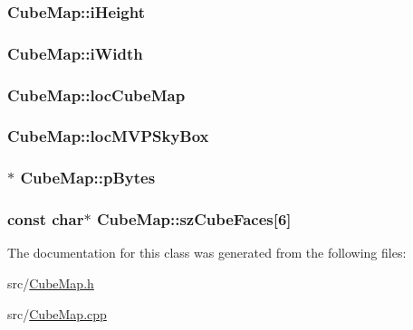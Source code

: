 \hypertarget{class_cube_map_a3eb7318d91d9790719dccfba29d80339}{
\subsubsection[{i\-Height}]{ Cube\-Map\-::i\-Height}}\label{class_cube_map_a3eb7318d91d9790719dccfba29d80339}
\hypertarget{class_cube_map_abc8fae6477d92d7a974f7d924aa932fc}{
\subsubsection[{i\-Width}]{ Cube\-Map\-::i\-Width}}\label{class_cube_map_abc8fae6477d92d7a974f7d924aa932fc}
\hypertarget{class_cube_map_aba9d6a9c7f818edba9bd19611d3b2fdc}{
\subsubsection[{loc\-Cube\-Map}]{ Cube\-Map\-::loc\-Cube\-Map}}\label{class_cube_map_aba9d6a9c7f818edba9bd19611d3b2fdc}
\hypertarget{class_cube_map_a112ed4032bed21e59f649eb28d99a72f}{
\subsubsection[{loc\-M\-V\-P\-Sky\-Box}]{ Cube\-Map\-::loc\-M\-V\-P\-Sky\-Box}}\label{class_cube_map_a112ed4032bed21e59f649eb28d99a72f}
\hypertarget{class_cube_map_aaede2138131291660c5758634f15adec}{
\subsubsection[{p\-Bytes}]{$\ast$ Cube\-Map\-::p\-Bytes}}\label{class_cube_map_aaede2138131291660c5758634f15adec}
\hypertarget{class_cube_map_a9174fa6b7453790a52d6a5e3fc72807b}{
\subsubsection[{sz\-Cube\-Faces}]{\setlength{\rightskip}{0pt plus 5cm}const char$\ast$ Cube\-Map\-::sz\-Cube\-Faces\mbox{[}6\mbox{]}}}\label{class_cube_map_a9174fa6b7453790a52d6a5e3fc72807b}


The documentation for this class was generated from the following files\-:\begin{DoxyCompactItemize}
\item 
src/\hyperlink{_cube_map_8h}{Cube\-Map.\-h}\item 
src/\hyperlink{_cube_map_8cpp}{Cube\-Map.\-cpp}\end{DoxyCompactItemize}
